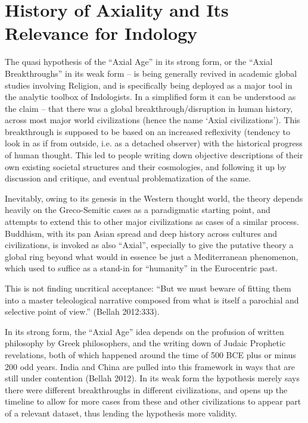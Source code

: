 \section*{History of Axiality and Its Relevance for Indology}

The quasi hypothesis of the “Axial Age” in its strong form, or the “Axial Breakthroughs” in its weak form – is being generally revived in academic global studies involving Religion, and is specifically being deployed as a major tool in the analytic toolbox of Indologists. In a simplified form it can be understood as the claim – that there was a global breakthrough/disruption in human history, across most major world civilizations (hence the name ‘Axial civilizations’). This breakthrough is supposed to be based on an increased reflexivity (tendency to look in as if from outside, i.e. as a detached observer) with the historical progress of human thought. This led to people writing down objective descriptions of their own existing societal structures and their cosmologies, and following it up by discussion and critique, and eventual problematization of the same.

Inevitably, owing to its genesis in the Western thought world, the theory depends heavily on the Greco-Semitic cases as a paradigmatic starting point, and attempts to extend this to other major civilizations as cases of a similar process. Buddhism, with its pan Asian spread and deep history across cultures and civilizations, is invoked as also “Axial”, especially to give the putative theory a global ring beyond what would in essence be just a Mediterranean phenomenon, which used to suffice as a stand-in for “humanity” in the Eurocentric past.

This is not finding uncritical acceptance: “But we must beware of fitting them into a master teleological narrative composed from what is itself a parochial and selective point of view.” (Bellah 2012:333).

In its strong form, the “Axial Age” idea depends on the profusion of written philosophy by Greek philosophers, and the writing down of Judaic Prophetic revelations, both of which happened around the time of 500 BCE plus or minus 200 odd years. India and China are pulled into this framework in ways that are still under contention (Bellah 2012). In its weak form the hypothesis merely says there were different breakthroughs in different civilizations, and opens up the timeline to allow for more cases from these and other civilizations to appear part of a relevant dataset, thus lending the hypothesis more validity.

